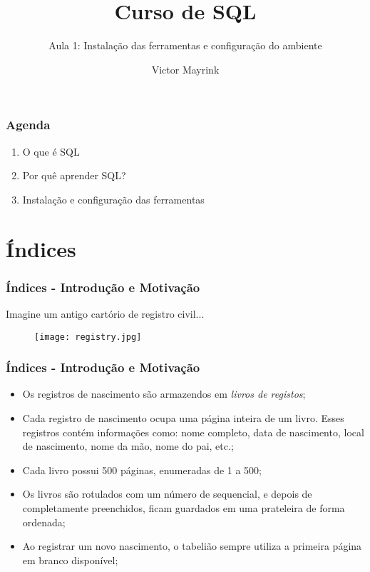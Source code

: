 \documentclass[t, 10pt, aspectratio=169, table, x11names]{beamer}
\begin{document}
	\author{Victor Mayrink}
	\title{Curso de SQL}
	\subtitle{Aula 1: Instalação das ferramentas e configuração do ambiente}

	\begin{frame}[plain]
		\maketitle
	\end{frame}

	\begin{frame}
		\frametitle{Agenda}
		\vspace{1cm}
		\begin{enumerate}
			\large
			\item O que é SQL
			\item Por quê aprender SQL?
			\item Instalação e configuração das ferramentas
		\end{enumerate}
	\end{frame}
	

	\section{Índices}

	\begin{frame}
		\frametitle{Índices - Introdução e Motivação}
		Imagine um antigo cartório de registro civil...
		\bigskip
		\begin{figure}[h]
			\centering
			\texttt{[image: registry.jpg]}
		\end{figure}
	\end{frame}

	\begin{frame}
		\frametitle{Índices - Introdução e Motivação}
		\begin{itemize}
			\item Os  registros de nascimento são armazendos em \textit{livros de registos};
			\bigskip
			\item Cada registro de nascimento ocupa uma página inteira de um livro. Esses registros contém informações como: nome completo, data de nascimento, local de nascimento, nome da mão, nome do pai, etc.;
			\bigskip
			\item Cada livro possui 500 páginas, enumeradas de 1 a 500;
			\bigskip
			\item Os livros são rotulados com um número de sequencial, e depois de completamente preenchidos, ficam guardados em uma prateleira de forma ordenada;
			\bigskip
			\item Ao registrar um novo nascimento, o tabelião sempre utiliza a primeira página em branco disponível;
		\end{itemize}
	\end{frame}
\end{document}
